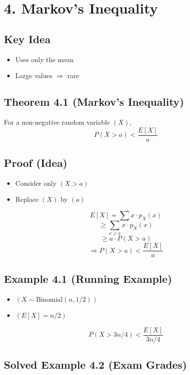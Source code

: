 \documentclass[11pt]{article}
\begin{document}
\section*{4. Markov’s Inequality}

\subsection*{Key Idea}

\begin{itemize}
\item Uses only the mean
\item Large values $\Rightarrow$ rare
\end{itemize}

\subsection*{Theorem 4.1 (Markov’s Inequality)}

For a non-negative random variable $( X )$,
\[
P(X > a) < \frac{E[X]}{a}
\]

\subsection*{Proof (Idea)}

\begin{itemize}
\item Consider only $( X > a )$
\item Replace $( X )$ by $( a )$
\end{itemize}

\[
E[X] = \sum x \cdot p_X(x)
\]
\[
\ge \sum_{x \ge a} x \cdot p_X(x)
\]
\[
\ge a \cdot P(X > a)
\]
\[
\Rightarrow P(X > a) < \frac{E[X]}{a}
\]

\subsection*{Example 4.1 (Running Example)}

\begin{itemize}
\item $( X \sim \text{Binomial}(n,1/2) )$
\item $( E[X] = n/2 )$
\end{itemize}

\[
P(X > 3n/4) < \frac{E[X]}{3n/4}
\]

\subsection*{Solved Example 4.2 (Exam Grades)}
\end{document}
